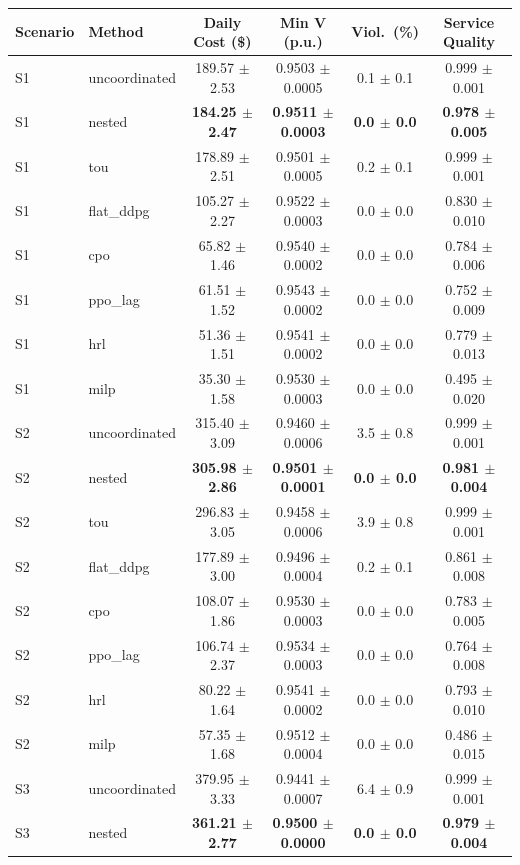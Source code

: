 \begin{tabular}{llcccc}
\toprule
Scenario & Method & Daily Cost (\$) & Min V (p.u.) & Viol.\ (\%) & Service Quality \\
\midrule
S1 & uncoordinated & 189.57 $\pm$ 2.53 & 0.9503 $\pm$ 0.0005 & 0.1 $\pm$ 0.1 & 0.999 $\pm$ 0.001 \\
S1 & nested & \textbf{184.25 $\pm$ 2.47} & \textbf{0.9511 $\pm$ 0.0003} & \textbf{0.0 $\pm$ 0.0} & \textbf{0.978 $\pm$ 0.005} \\
S1 & tou & 178.89 $\pm$ 2.51 & 0.9501 $\pm$ 0.0005 & 0.2 $\pm$ 0.1 & 0.999 $\pm$ 0.001 \\
S1 & flat_ddpg & 105.27 $\pm$ 2.27 & 0.9522 $\pm$ 0.0003 & 0.0 $\pm$ 0.0 & 0.830 $\pm$ 0.010 \\
S1 & cpo & 65.82 $\pm$ 1.46 & 0.9540 $\pm$ 0.0002 & 0.0 $\pm$ 0.0 & 0.784 $\pm$ 0.006 \\
S1 & ppo_lag & 61.51 $\pm$ 1.52 & 0.9543 $\pm$ 0.0002 & 0.0 $\pm$ 0.0 & 0.752 $\pm$ 0.009 \\
S1 & hrl & 51.36 $\pm$ 1.51 & 0.9541 $\pm$ 0.0002 & 0.0 $\pm$ 0.0 & 0.779 $\pm$ 0.013 \\
S1 & milp & 35.30 $\pm$ 1.58 & 0.9530 $\pm$ 0.0003 & 0.0 $\pm$ 0.0 & 0.495 $\pm$ 0.020 \\
\midrule
S2 & uncoordinated & 315.40 $\pm$ 3.09 & 0.9460 $\pm$ 0.0006 & 3.5 $\pm$ 0.8 & 0.999 $\pm$ 0.001 \\
S2 & nested & \textbf{305.98 $\pm$ 2.86} & \textbf{0.9501 $\pm$ 0.0001} & \textbf{0.0 $\pm$ 0.0} & \textbf{0.981 $\pm$ 0.004} \\
S2 & tou & 296.83 $\pm$ 3.05 & 0.9458 $\pm$ 0.0006 & 3.9 $\pm$ 0.8 & 0.999 $\pm$ 0.001 \\
S2 & flat_ddpg & 177.89 $\pm$ 3.00 & 0.9496 $\pm$ 0.0004 & 0.2 $\pm$ 0.1 & 0.861 $\pm$ 0.008 \\
S2 & cpo & 108.07 $\pm$ 1.86 & 0.9530 $\pm$ 0.0003 & 0.0 $\pm$ 0.0 & 0.783 $\pm$ 0.005 \\
S2 & ppo_lag & 106.74 $\pm$ 2.37 & 0.9534 $\pm$ 0.0003 & 0.0 $\pm$ 0.0 & 0.764 $\pm$ 0.008 \\
S2 & hrl & 80.22 $\pm$ 1.64 & 0.9541 $\pm$ 0.0002 & 0.0 $\pm$ 0.0 & 0.793 $\pm$ 0.010 \\
S2 & milp & 57.35 $\pm$ 1.68 & 0.9512 $\pm$ 0.0004 & 0.0 $\pm$ 0.0 & 0.486 $\pm$ 0.015 \\
\midrule
S3 & uncoordinated & 379.95 $\pm$ 3.33 & 0.9441 $\pm$ 0.0007 & 6.4 $\pm$ 0.9 & 0.999 $\pm$ 0.001 \\
S3 & nested & \textbf{361.21 $\pm$ 2.77} & \textbf{0.9500 $\pm$ 0.0000} & \textbf{0.0 $\pm$ 0.0} & \textbf{0.979 $\pm$ 0.004} \\

\end{tabular}

